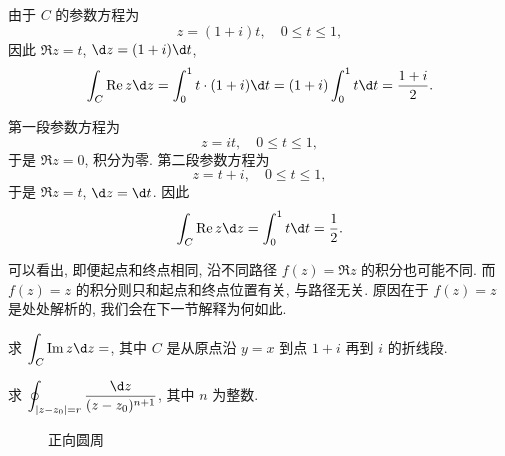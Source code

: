 \begin{solution}
  \begin{enumnopar}
    \item 由于 $C$ 的参数方程为
      \[
        z=(1+i)t,\quad 0\le t\le 1,
      \]
      因此 $\Re z=t$, $\d z=(1+i)\d t$,
      \[
        \int_C\Re z\d z=\int_0^1t\cdot(1+i)\d t
        =(1+i)\int_0^1t\d t
        =\frac{1+i}2.
      \]
    \item 第一段参数方程为
      \[
        z=it,\quad 0\le t\le 1,
      \]
      于是 $\Re z=0$, 积分为零. 第二段参数方程为
      \[
        z=t+i,\quad 0\le t\le 1,
      \]
      于是 $\Re z=t$, $\d z=\d t$. 因此
      \[
        \int_C\Re z\d z=\int_0^1 t\d t=\frac12.
      \]
  \end{enumnopar}
\end{solution}

可以看出, 即便起点和终点相同, 沿不同路径 $f(z)=\Re z$ 的积分也可能不同.
而 $f(z)=z$ 的积分则只和起点和终点位置有关, 与路径无关.
原因在于 $f(z)=z$ 是处处解析的, 我们会在下一节解释为何如此.

\begin{exercise}
  求 $\displaystyle\int_C\Im z\d z=$\fillblank[2cm]{}, 其中 $C$ 是从原点沿 $y=x$ 到点 $1+i$ 再到 $i$ 的折线段.
\end{exercise}

\begin{example}
  求 $\displaystyle\oint_{|z-z_0|=r}\frac{\d z}{(z-z_0)^{n+1}}$, 其中 $n$ 为整数.
\end{example}

\begin{figure}[!ht]
  \centering
  \caption{正向圆周}
\end{figure}

